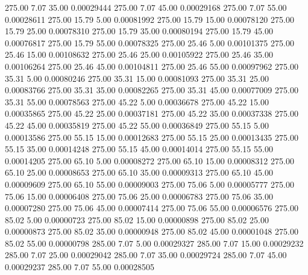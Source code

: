     275.00      7.07     35.00     0.00029444
    275.00      7.07     45.00     0.00029168
    275.00      7.07     55.00     0.00028611
    275.00     15.79      5.00     0.00081992
    275.00     15.79     15.00     0.00078120
    275.00     15.79     25.00     0.00078310
    275.00     15.79     35.00     0.00080194
    275.00     15.79     45.00     0.00076817
    275.00     15.79     55.00     0.00078325
    275.00     25.46      5.00     0.00101375
    275.00     25.46     15.00     0.00108632
    275.00     25.46     25.00     0.00105922
    275.00     25.46     35.00     0.00106264
    275.00     25.46     45.00     0.00104811
    275.00     25.46     55.00     0.00097962
    275.00     35.31      5.00     0.00080246
    275.00     35.31     15.00     0.00081093
    275.00     35.31     25.00     0.00083766
    275.00     35.31     35.00     0.00082265
    275.00     35.31     45.00     0.00077009
    275.00     35.31     55.00     0.00078563
    275.00     45.22      5.00     0.00036678
    275.00     45.22     15.00     0.00035865
    275.00     45.22     25.00     0.00037181
    275.00     45.22     35.00     0.00037338
    275.00     45.22     45.00     0.00035819
    275.00     45.22     55.00     0.00036849
    275.00     55.15      5.00     0.00013586
    275.00     55.15     15.00     0.00012683
    275.00     55.15     25.00     0.00013435
    275.00     55.15     35.00     0.00014248
    275.00     55.15     45.00     0.00014014
    275.00     55.15     55.00     0.00014205
    275.00     65.10      5.00     0.00008272
    275.00     65.10     15.00     0.00008312
    275.00     65.10     25.00     0.00008653
    275.00     65.10     35.00     0.00009313
    275.00     65.10     45.00     0.00009609
    275.00     65.10     55.00     0.00009003
    275.00     75.06      5.00     0.00005777
    275.00     75.06     15.00     0.00006408
    275.00     75.06     25.00     0.00006783
    275.00     75.06     35.00     0.00007280
    275.00     75.06     45.00     0.00007414
    275.00     75.06     55.00     0.00006576
    275.00     85.02      5.00     0.00000723
    275.00     85.02     15.00     0.00000898
    275.00     85.02     25.00     0.00000873
    275.00     85.02     35.00     0.00000948
    275.00     85.02     45.00     0.00001048
    275.00     85.02     55.00     0.00000798
    285.00      7.07      5.00     0.00029327
    285.00      7.07     15.00     0.00029232
    285.00      7.07     25.00     0.00029042
    285.00      7.07     35.00     0.00029724
    285.00      7.07     45.00     0.00029237
    285.00      7.07     55.00     0.00028505
